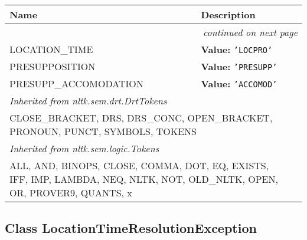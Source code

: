    \vspace{-1cm}
\hspace{\varindent}\begin{longtable}{|p{\varnamewidth}|p{\vardescrwidth}|l}
\cline{1-2}
\cline{1-2} \centering \textbf{Name} & \centering \textbf{Description}& \\
\cline{1-2}
\endhead\cline{1-2}\multicolumn{3}{r}{\small\textit{continued on next page}}\\\endfoot\cline{1-2}
\endlastfoot\raggedright L\-O\-C\-A\-T\-I\-O\-N\-\_\-T\-I\-M\-E\- & \raggedright \textbf{Value:} 
{\tt \texttt{'}\texttt{LOCPRO}\texttt{'}}&\\
\cline{1-2}
\raggedright P\-R\-E\-S\-U\-P\-P\-O\-S\-I\-T\-I\-O\-N\- & \raggedright \textbf{Value:} 
{\tt \texttt{'}\texttt{PRESUPP}\texttt{'}}&\\
\cline{1-2}
\raggedright P\-R\-E\-S\-U\-P\-P\-\_\-A\-C\-C\-O\-M\-O\-D\-A\-T\-I\-O\-N\- & \raggedright \textbf{Value:} 
{\tt \texttt{'}\texttt{ACCOMOD}\texttt{'}}&\\
\cline{1-2}
\multicolumn{2}{|l|}{\textit{Inherited from nltk.sem.drt.DrtTokens}}\\
\multicolumn{2}{|p{\varwidth}|}{\raggedright CLOSE\_BRACKET, DRS, DRS\_CONC, OPEN\_BRACKET, PRONOUN, PUNCT, SYMBOLS, TOKENS}\\
\cline{1-2}
\multicolumn{2}{|l|}{\textit{Inherited from nltk.sem.logic.Tokens}}\\
\multicolumn{2}{|p{\varwidth}|}{\raggedright ALL, AND, BINOPS, CLOSE, COMMA, DOT, EQ, EXISTS, IFF, IMP, LAMBDA, NEQ, NLTK, NOT, OLD\_NLTK, OPEN, OR, PROVER9, QUANTS, x}\\
\cline{1-2}
\end{longtable}



\subsection{Class LocationTimeResolutionException}

